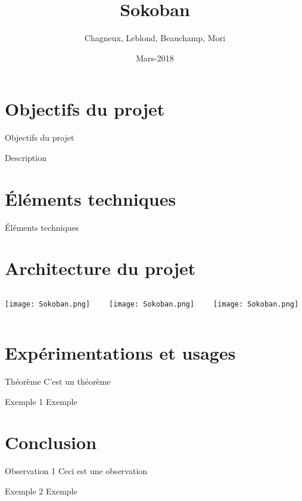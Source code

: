 \documentclass{beamer}
\title{Sokoban}
\author{Chagneux, Leblond, Beauchamp, Mori}
\date{Mars-2018}
\begin{document}
 
\frame{\titlepage}
\begin{frame}
 \tableofcontents
\end{frame}
\section{Objectifs du projet}
\begin{frame}
Objectifs du projet
\end{frame}

\begin{frame}
Description
\end{frame}
\section{Éléments techniques}
\begin{frame}
Éléments techniques
\end{frame}

\section{Architecture du projet}
\begin{frame}
\begin{columns}
\begin{column}{4cm}
\texttt{[image: Sokoban.png]}
\end{column}

\begin{column}{4cm}
\texttt{[image: Sokoban.png]}
\end{column}

\begin{column}{4cm}
\texttt{[image: Sokoban.png]}
\end{column}
\end{columns}
\end{frame}

\section{Expérimentations et usages}
\begin{frame}
\begin{block}{Théorème}
C'est un théorème
\end{block}
\pause
\begin{exampleblock}{Exemple 1}
Exemple
\end{exampleblock}
\end{frame}

\section{Conclusion}
\begin{frame}
\begin{alertblock}{Observation 1}
Ceci est une observation
\end{alertblock}
\pause
\begin{exampleblock}{Exemple 2}
Exemple
\end{exampleblock}
\end{frame}
\end{document}
